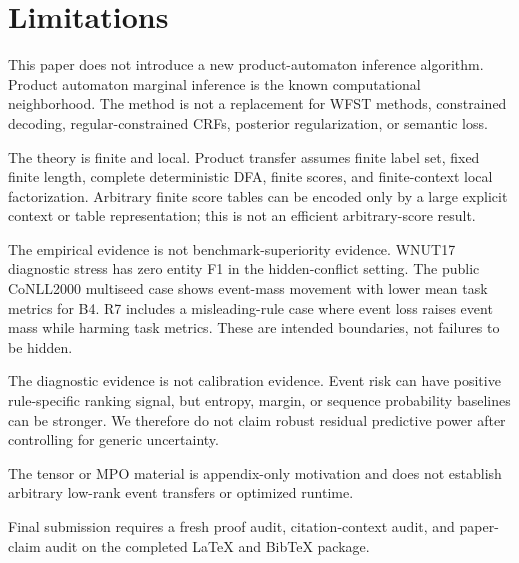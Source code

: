 \section{Limitations}

This paper does not introduce a new product-automaton inference algorithm.
Product automaton marginal inference is the known computational neighborhood.
The method is not a replacement for WFST methods, constrained decoding,
regular-constrained CRFs, posterior regularization, or semantic loss.

The theory is finite and local.  Product transfer assumes finite label set,
fixed finite length, complete deterministic DFA, finite scores, and
finite-context local factorization.  Arbitrary finite score tables can be
encoded only by a large explicit context or table representation; this is not
an efficient arbitrary-score result.

The empirical evidence is not benchmark-superiority evidence.  WNUT17
diagnostic stress has zero entity F1 in the hidden-conflict setting.  The public
CoNLL2000 multiseed case shows event-mass movement with lower mean task metrics
for B4.  R7 includes a misleading-rule case where event loss raises event mass
while harming task metrics.  These are intended boundaries, not failures to be
hidden.

The diagnostic evidence is not calibration evidence.  Event risk can have
positive rule-specific ranking signal, but entropy, margin, or sequence
probability baselines can be stronger.  We therefore do not claim robust
residual predictive power after controlling for generic uncertainty.

The tensor or MPO material is appendix-only motivation and does not establish
arbitrary low-rank event transfers or optimized runtime.

Final submission requires a fresh proof audit, citation-context audit, and
paper-claim audit on the completed LaTeX and BibTeX package.
